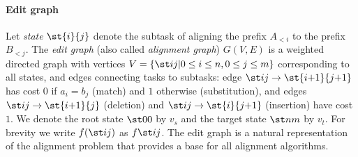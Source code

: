 \paragraph{Edit graph}
Let \emph{state} $\st{i}{j}$ denote the subtask of aligning the prefix $A_{<i}$
to the prefix $B_{<j}$. The \emph{edit graph} (also called \emph{alignment
graph}) $G(V,E)$ is a weighted directed graph with vertices $V = \{\st ij \vert
{0\leq i \leq n}, {0\leq j\leq m}\}$ corresponding to all states, and edges
connecting tasks to subtasks: edge ${\st ij \to \st{i{+}1}{j{+}1}}$ has cost
$0$ if ${a_i = b_j}$ (match) and $1$ otherwise (substitution), and edges ${\st ij
\to \st{i{+}1}{j}}$ (deletion) and ${\st ij \to\st{i}{j{+}1}}$ (insertion) have cost
$1$. We denote the root state $\st 00$ by $v_s$ and the target state $\st nm$ by
$v_t$.
For brevity we write $f(\st ij)$ as $f \st ij$.
The edit graph is a natural representation of the alignment problem that
provides a base for all alignment algorithms.